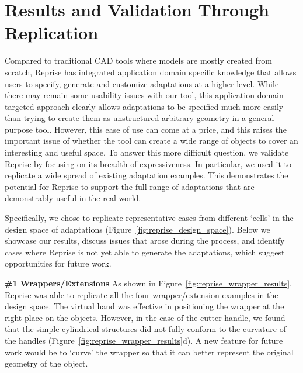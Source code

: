 \section{Results and Validation Through Replication}
Compared to traditional CAD tools where models are mostly created from scratch, Reprise has integrated application domain specific knowledge that allows users to specify, generate and customize adaptations at a higher level. While there may remain some usability issues with our tool, this application domain targeted approach clearly allows adaptations to be specified much more easily than trying to create them as unstructured arbitrary geometry in a general-purpose tool.  However, this ease of use can come at a price, and this raises the important issue of whether the tool can create a wide range of objects to cover an interesting and useful space. To answer this more difficult question, we validate Reprise by focusing on its breadth of expressiveness.  In particular, we used it to replicate a wide spread of existing adaptation examples. This demonstrates the potential for Reprise to support the full range of adaptations that are demonstrably useful in the real world.


Specifically, we chose to replicate representative cases from different `cells' in the design space of adaptations (Figure~\ref{fig:reprise_design_space}). Below we showcase our results, discuss issues that arose during the process, and identify cases where Reprise is not yet able to generate the adaptations, which suggest opportunities for future work.


\textbf{\#1 Wrappers/Extensions}
As shown in Figure~\ref{fig:reprise_wrapper_results}, Reprise was able to replicate all the four wrapper/extension examples in the design space. The virtual hand was effective in positioning the wrapper at the right place on the objects. However, in the case of the cutter handle, we found that the simple cylindrical structures did not fully conform to the curvature of the handles (Figure~\ref{fig:reprise_wrapper_results}d). A new feature for future work would be to `curve' the wrapper so that it can better represent the original geometry of the object.


